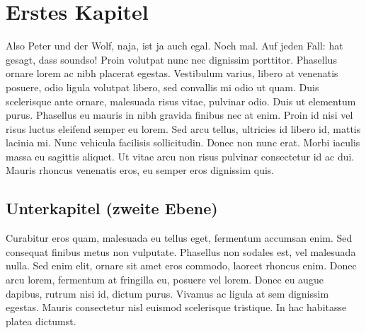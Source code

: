 \documentclass[12pt,a4paper,parskip=half]{scrartcl}
\begin{document}

\OWmaketitle

\OWtoc


\section{Erstes Kapitel}

Also Peter und der Wolf, naja, ist ja auch egal. Noch mal. Auf jeden Fall: \cite{L¹} hat gesagt, dass soundso! Proin volutpat nunc nec dignissim porttitor. Phasellus ornare lorem ac nibh placerat egestas. Vestibulum varius, libero at venenatis posuere, odio ligula volutpat libero, sed convallis mi odio ut quam. Duis scelerisque ante ornare, malesuada risus vitae, pulvinar odio. Duis ut elementum purus. Phasellus eu mauris in nibh gravida finibus nec at enim. Proin id nisi vel risus luctus eleifend semper eu lorem. Sed arcu tellus, ultricies id libero id, mattis lacinia mi. Nunc vehicula facilisis sollicitudin. Donec non nunc erat. Morbi iaculis massa eu sagittis aliquet. Ut vitae arcu non risus pulvinar consectetur id ac dui. Mauris rhoncus venenatis eros, eu semper eros dignissim quis.

\subsection{Unterkapitel (zweite Ebene)}

Curabitur eros quam, malesuada eu tellus eget, fermentum accumsan enim. Sed consequat finibus metus non vulputate. Phasellus non sodales est, vel malesuada nulla. Sed enim elit, ornare sit amet eros commodo, laoreet rhoncus enim. Donec arcu lorem, fermentum at fringilla eu, posuere vel lorem. Donec eu augue dapibus, rutrum nisi id, dictum purus. Vivamus ac ligula at sem dignissim egestas. Mauris consectetur nisl euismod scelerisque tristique. In hac habitasse platea dictumst.
\end{document}
